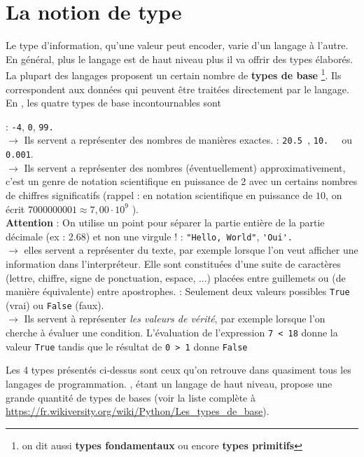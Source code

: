 \section{La notion de type}
Le type d'information, qu'une valeur peut encoder, varie d'un langage à l'autre. En général, plus le langage est de haut niveau plus il va offrir des types élaborés. La plupart des langages proposent un certain nombre de \textbf{types de base} \footnote{on dit aussi \textbf{types fondamentaux} ou encore \textbf{types primitifs}}. Ils correspondent aux données qui peuvent être traitées directement par le langage. En \py, les quatre types de base incontournables sont
\begin{enumerate}
	:  \lstinline{-4}, \lstinline{0}, \lstinline{99.}\\
	$ \longrightarrow$ Ils servent a représenter des nombres de manières exactes.
	 : \lstinline{20.5 },  \lstinline{10.  } ou \lstinline{ 0.001}.\\
	$ \longrightarrow$ Ils servent a représenter des nombres (éventuellement) approximativement, c’est un genre de notation scientifique en puissance de 2 avec un certains nombres de chiffres significatifs (rappel : en notation scientifique en puissance de $10$, on écrit $7000000001 \approx 7,00 \cdot 10^9$ ).\\
	\textbf{Attention} : On utilise un point pour séparer la partie entière de la partie décimale (ex : 2.68) et non une virgule !
	: \lstinline{"Hello, World"}, \lstinline{'Oui'.}\\
	$ \longrightarrow$ elles servent a représenter du texte, par exemple lorsque l’on veut afficher une information dans l’interpréteur. Elle sont constituées d'une suite de caractères
	(lettre, chiffre, signe de ponctuation, espace, ...) placées entre guillemets ou (de manière équivalente) entre apostrophes.
	: Seulement deux valeurs possibles \lstinline{True} (vrai) ou \lstinline{False} (faux).\\
	$ \longrightarrow$ Ils servent à représenter \textit{les valeurs de vérité}, par exemple lorsque l'on cherche à évaluer une condition. L'évaluation de l'expression \lstinline{7 < 18} donne la valeur \lstinline{True} tandis que le résultat de \lstinline{0 > 1} donne \lstinline{False}
\end{enumerate}
Les 4 types présentés ci-dessus sont ceux qu'on retrouve dans quasiment tous les langages de programmation. \py, étant un langage de haut niveau, propose une grande quantité de types de bases (voir la liste complète à \url{https://fr.wikiversity.org/wiki/Python/Les_types_de_base}).

